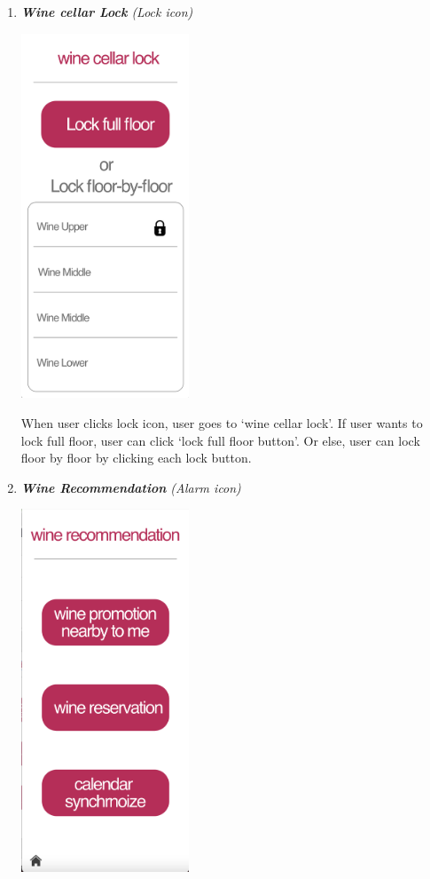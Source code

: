 \documentclass[conference]{IEEEtran}
\numberwithin{figure}{subsection}
\begin{document}
\begin{enumerate}
\begin{enumerate}
        \item \textit{\textbf{Wine cellar Lock} (Lock icon)}\\
        \centerline{\includegraphics[width=5cm]{lock.png}}
        When user clicks lock icon, user goes to ‘wine cellar lock’. If user wants to lock full floor, user can click ‘lock full floor button’. Or else, user can lock floor by floor by clicking each lock button.
        \item \textit{\textbf{Wine Recommendation} (Alarm icon)}\\
        \centerline{\includegraphics[width=5cm]{winerec.png}}

\end{enumerate}
\end{enumerate}
\end{document}
